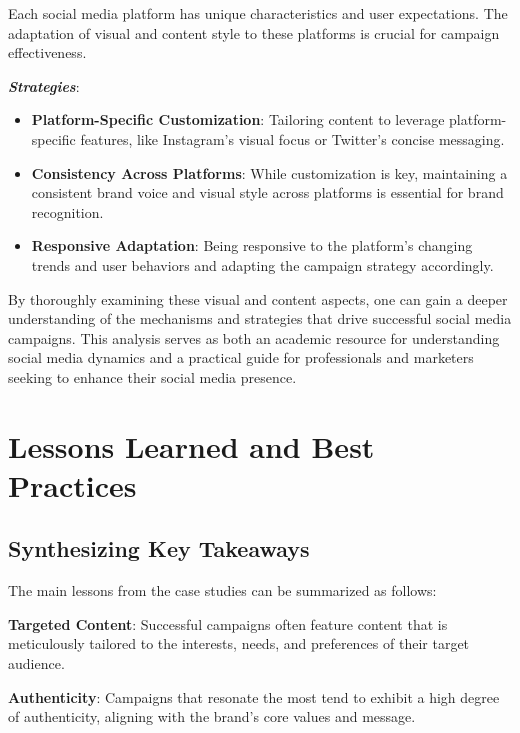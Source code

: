 \documentclass[
]{book}
\providecommand{\tightlist}{%
  \setlength{\itemsep}{0pt}\setlength{\parskip}{0pt}}
\begin{document}
Each social media platform has unique characteristics and user expectations. The adaptation of visual and content style to these platforms is crucial for campaign effectiveness.

\textbf{\emph{Strategies}}:

\begin{itemize}
\tightlist
\item
  \textbf{Platform-Specific Customization}: Tailoring content to leverage platform-specific features, like Instagram's visual focus or Twitter's concise messaging.
\item
  \textbf{Consistency Across Platforms}: While customization is key, maintaining a consistent brand voice and visual style across platforms is essential for brand recognition.
\item
  \textbf{Responsive Adaptation}: Being responsive to the platform's changing trends and user behaviors and adapting the campaign strategy accordingly.
\end{itemize}

By thoroughly examining these visual and content aspects, one can gain a deeper understanding of the mechanisms and strategies that drive successful social media campaigns. This analysis serves as both an academic resource for understanding social media dynamics and a practical guide for professionals and marketers seeking to enhance their social media presence.

\hypertarget{lessons-learned-and-best-practices}{%
\section*{Lessons Learned and Best Practices}\label{lessons-learned-and-best-practices}}

\hypertarget{synthesizing-key-takeaways}{%
\subsection{Synthesizing Key Takeaways}\label{synthesizing-key-takeaways}}

The main lessons from the case studies can be summarized as follows:

\textbf{Targeted Content}: Successful campaigns often feature content that is meticulously tailored to the interests, needs, and preferences of their target audience.

\textbf{Authenticity}: Campaigns that resonate the most tend to exhibit a high degree of authenticity, aligning with the brand's core values and message.
\end{document}
